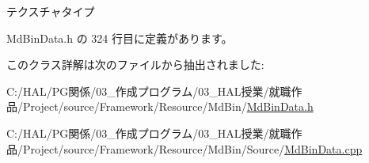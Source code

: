 テクスチャタイプ 



 Md\+Bin\+Data.\+h の 324 行目に定義があります。



このクラス詳解は次のファイルから抽出されました\+:\begin{DoxyCompactItemize}
\item 
C\+:/\+H\+A\+L/\+P\+G関係/03\+\_\+作成プログラム/03\+\_\+\+H\+A\+L授業/就職作品/\+Project/source/\+Framework/\+Resource/\+Md\+Bin/\mbox{\hyperlink{_md_bin_data_8h}{Md\+Bin\+Data.\+h}}\item 
C\+:/\+H\+A\+L/\+P\+G関係/03\+\_\+作成プログラム/03\+\_\+\+H\+A\+L授業/就職作品/\+Project/source/\+Framework/\+Resource/\+Md\+Bin/\+Source/\mbox{\hyperlink{_md_bin_data_8cpp}{Md\+Bin\+Data.\+cpp}}\end{DoxyCompactItemize}

